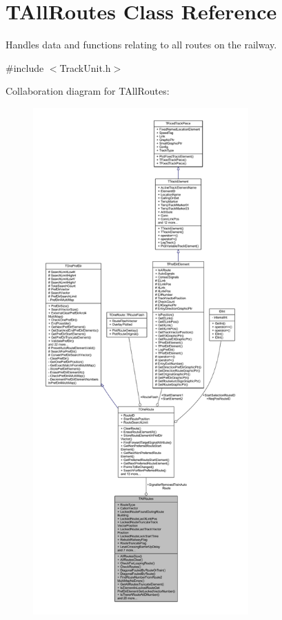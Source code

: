 \hypertarget{class_t_all_routes}{}\section{T\+All\+Routes Class Reference}
\label{class_t_all_routes}


Handles data and functions relating to all routes on the railway.  




{\ttfamily \#include $<$Track\+Unit.\+h$>$}



Collaboration diagram for T\+All\+Routes\+:
\nopagebreak
\begin{figure}[H]
\begin{center}
\leavevmode
\includegraphics[height=550pt]{class_t_all_routes__coll__graph}
\end{center}
\end{figure}
